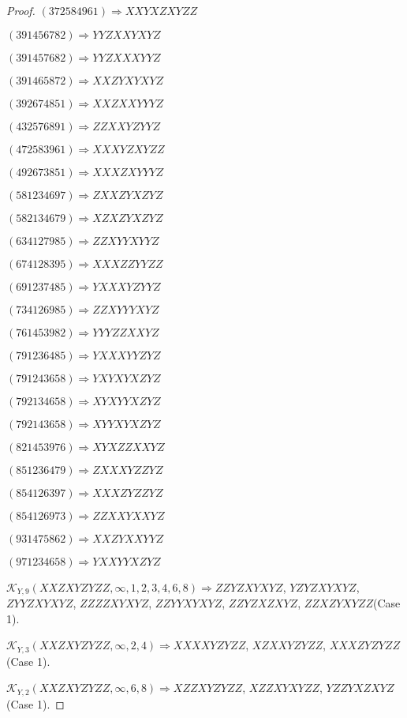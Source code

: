 \documentclass[12pt]{article}
\theoremstyle{plain}
\theoremstyle{definition}
\theoremstyle{remark}
\newcommand{\fancy}[1]{\mathcal{#1}}
\def\K{\fancy{K}}
\begin{document}
\begin{proof}
	$(3 7 2 5 8 4 9 6 1)\Rightarrow XXYXZXYZZ$
	
	$(3 9 1 4 5 6 7 8 2)\Rightarrow YYZXXYXYZ$
	
	$(3 9 1 4 5 7 6 8 2)\Rightarrow YYZXXXYYZ$
	
	$(3 9 1 4 6 5 8 7 2)\Rightarrow XXZYXYXYZ$
	
	$(3 9 2 6 7 4 8 5 1)\Rightarrow XXZXXYYYZ$
	
	$(4 3 2 5 7 6 8 9 1)\Rightarrow ZZXXYZYYZ$
	
	$(4 7 2 5 8 3 9 6 1)\Rightarrow XXXYZXYZZ$
	
	$(4 9 2 6 7 3 8 5 1)\Rightarrow XXXZXYYYZ$
	
	$(5 8 1 2 3 4 6 9 7)\Rightarrow ZXXZYXZYZ$
	
	$(5 8 2 1 3 4 6 7 9)\Rightarrow XZXZYXZYZ$
	
	$(6 3 4 1 2 7 9 8 5)\Rightarrow ZZXYYXYYZ$
	
	$(6 7 4 1 2 8 3 9 5)\Rightarrow XXXZZYYZZ$
	
	$(6 9 1 2 3 7 4 8 5)\Rightarrow YXXXYZYYZ$
	
	$(7 3 4 1 2 6 9 8 5)\Rightarrow ZZXYYYXYZ$
	
	$(7 6 1 4 5 3 9 8 2)\Rightarrow YYYZZXXYZ$
	
	$(7 9 1 2 3 6 4 8 5)\Rightarrow YXXXYYZYZ$
	
	$(7 9 1 2 4 3 6 5 8)\Rightarrow YXYXYXZYZ$
	
	$(7 9 2 1 3 4 6 5 8)\Rightarrow XYXYYXZYZ$
	
	$(7 9 2 1 4 3 6 5 8)\Rightarrow XYYXYXZYZ$
	
	$(8 2 1 4 5 3 9 7 6)\Rightarrow XYXZZXXYZ$
	
	$(8 5 1 2 3 6 4 7 9)\Rightarrow ZXXXYZZYZ$
	
	$(8 5 4 1 2 6 3 9 7)\Rightarrow XXXZYZZYZ$
	
	$(8 5 4 1 2 6 9 7 3)\Rightarrow ZZXXYXXYZ$
	
	$(9 3 1 4 7 5 8 6 2)\Rightarrow XXZYXXYYZ$
	
	$(9 7 1 2 3 4 6 5 8)\Rightarrow YXXYYXZYZ$
	
	
	
	$\K_{Y,9}(XXZXYZYZZ,\infty,1, 2, 3, 4, 6, 8)\Rightarrow $$ZZYZXYXYZ$, $YZYZXYXYZ$, $ZYYZXYXYZ$, $ZZZZXYXYZ$, $ZZYYXYXYZ$, $ZZYZXZXYZ$, $ZZXZYXYZZ$(Case 1).
	
	$\K_{Y,3}(XXZXYZYZZ,\infty,2, 4)\Rightarrow $$XXXXYZYZZ$, $XZXXYZYZZ$, $XXXZYZYZZ$(Case 1).
	
	$\K_{Y,2}(XXZXYZYZZ,\infty,6, 8)\Rightarrow $$XZZXYZYZZ$, $XZZXYXYZZ$, $YZZYXZXYZ$(Case 1).
	

\end{proof}
\end{document}

